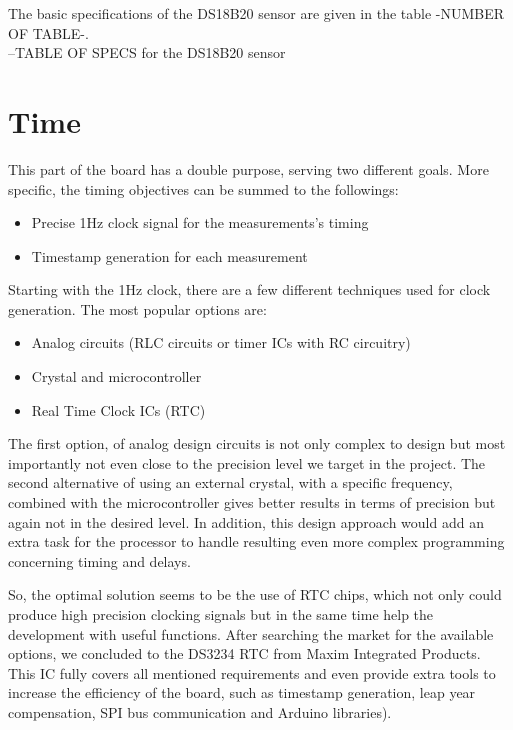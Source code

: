 The basic specifications of the DS18B20 sensor are given in the table -NUMBER OF TABLE-.\\

--TABLE OF SPECS for the DS18B20 sensor\\


\section{Time}
This part of the board has a double purpose, serving two different goals. More specific, the timing objectives can be summed to the followings:

\begin{itemize}
    \item Precise 1Hz clock signal for the measurements's timing
    \item Timestamp generation for each measurement
\end{itemize}

Starting with the 1Hz clock, there are a few different techniques used for clock generation. The most popular options are:

\begin{itemize}
    \item Analog circuits (RLC circuits or timer ICs with RC circuitry)
    \item Crystal and microcontroller
    \item Real Time Clock ICs (RTC)
\end{itemize}

The first option, of analog design circuits is not only complex to design but most importantly not even close to the precision level we target in the project. The second alternative of using an external crystal, with a specific frequency, combined with the microcontroller gives better results in terms of precision but again not in the desired level. In addition, this design approach would add an extra task for the processor to handle resulting even more complex programming concerning timing and delays.

So, the optimal solution seems to be the use of RTC chips, which not only could produce high precision clocking signals but in the same time help the development with useful functions. After searching the market for the available options, we concluded to the DS3234 RTC from Maxim Integrated Products. This IC fully covers all mentioned requirements and even provide extra tools to increase the efficiency of the board, such as timestamp generation, leap year compensation, SPI bus communication and Arduino libraries).\\

